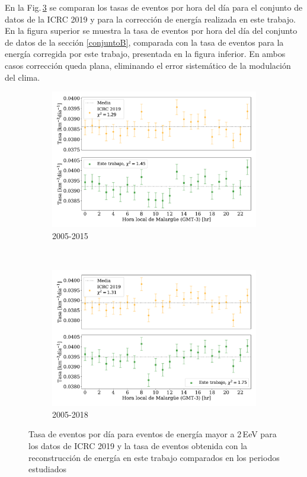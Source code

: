 En la Fig.\,\ref{final} se comparan los tasas de eventos por hora del día para el conjunto de datos de la ICRC 2019 y para la corrección de energía realizada en este trabajo. En la figura superior se muestra la tasa de eventos por hora del día del conjunto de datos de la sección \ref{conjuntoB}, comparada con la tasa de eventos para la energía corregida por este trabajo, presentada en la figura inferior. En ambos casos corrección queda plana, eliminando el error sistemático de la modulación del clima.
   \begin{figure}[H]
       \centering
           \begin{subfigure}[b]{0.8\textwidth}
           \includegraphics[width=\textwidth]{Graphs/rate_hour_of_the_day/2EeV_ICRC_2019_S38_S1000_expected.pdf}
           \caption{2005-2015} \label{fig:2EeV_expected}
           \end{subfigure}\\
           \begin{subfigure}[b]{0.8\textwidth}
           \includegraphics[width=\textwidth]{Graphs/rate_hour_of_the_day/2EeV_ICRC_2019_S38_S1000_expected_05_18.pdf}
           \caption{2005-2018}\label{fig:2EeV_expected_05_18}
           \end{subfigure}%
           \caption{Tasa de eventos por día para eventos de energía mayor a 2\,EeV para los datos de ICRC 2019 y la tasa de eventos obtenida con la reconstrucción de energía en este trabajo comparados en los periodos estudiados}\label{final}
   \end{figure}
